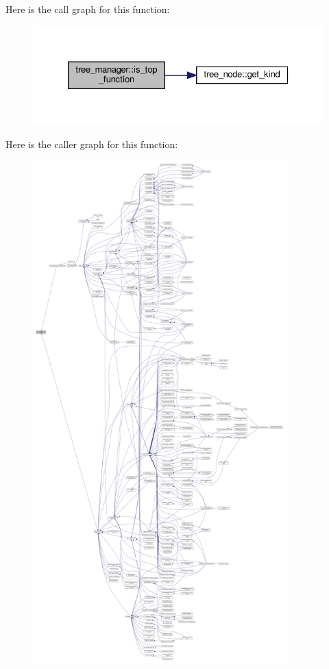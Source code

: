 Here is the call graph for this function\+:
\nopagebreak
\begin{figure}[H]
\begin{center}
\leavevmode
\includegraphics[width=326pt]{d2/ddd/classtree__manager_afc6bce0d4cba04bf033ad17f3fc9c5c1_cgraph}
\end{center}
\end{figure}
Here is the caller graph for this function\+:
\nopagebreak
\begin{figure}[H]
\begin{center}
\leavevmode
\includegraphics[height=550pt]{d2/ddd/classtree__manager_afc6bce0d4cba04bf033ad17f3fc9c5c1_icgraph}
\end{center}
\end{figure}
\mbox{\label{classtree__manager_a973841c46968ea6b7b820e74f701d091}} 
